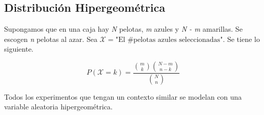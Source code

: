 
\subsection{Distribución Hipergeométrica}

Supongamos que en una caja hay \textit N pelotas, \textit m azules y \textit{N - m} amarillas. Se escogen \textit n pelotas al azar.  Sea $\mathcal X = \text{"El \#pelotas azules seleccionadas"}$. Se tiene lo siguiente.

\[P(\mathcal X = k) = \frac{\binom{m}{k} \binom{N - m}{n-k} }{\binom{N}{n}}\]

Todos los experimentos que tengan un contexto similar se modelan con una variable aleatoria hipergeométrica.

